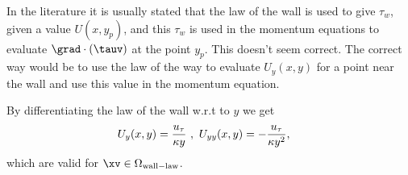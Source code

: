 In the literature it is usually stated that the law of the wall is used to give $\tau_w$, given a value $U(x,y_p)$, and
this $\tau_w$ is used in the momentum equations to evaluate $\grad\cdot(\tauv)$ at the point $y_p$. This doesn't
seem correct. The correct way would be to use the law of the way to evaluate $U_y(x,y)$ for a point near the
wall and use this value in the momentum equation.

By differentiating the law of the wall w.r.t to $y$ we get
\begin{align}
  U_y(x,y) &= {u_\tau \over\kappa y} ~,~
  U_{yy}(x,y) = - {u_\tau \over\kappa y^2}, 
\end{align}
which are valid for $\xv\in\OmegaWallLaw$. 


